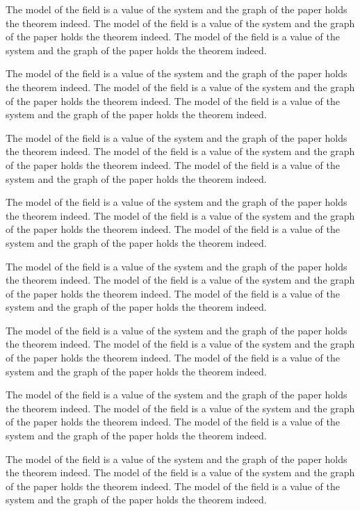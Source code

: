 \documentclass{article}
\begin{document}
The model of the field is a value of the system and the graph of the paper holds the theorem indeed. The model of the field is a value of the system and the graph of the paper holds the theorem indeed. The model of the field is a value of the system and the graph of the paper holds the theorem indeed.

The model of the field is a value of the system and the graph of the paper holds the theorem indeed. The model of the field is a value of the system and the graph of the paper holds the theorem indeed. The model of the field is a value of the system and the graph of the paper holds the theorem indeed.

The model of the field is a value of the system and the graph of the paper holds the theorem indeed. The model of the field is a value of the system and the graph of the paper holds the theorem indeed. The model of the field is a value of the system and the graph of the paper holds the theorem indeed.

The model of the field is a value of the system and the graph of the paper holds the theorem indeed. The model of the field is a value of the system and the graph of the paper holds the theorem indeed. The model of the field is a value of the system and the graph of the paper holds the theorem indeed.

The model of the field is a value of the system and the graph of the paper holds the theorem indeed. The model of the field is a value of the system and the graph of the paper holds the theorem indeed. The model of the field is a value of the system and the graph of the paper holds the theorem indeed.

The model of the field is a value of the system and the graph of the paper holds the theorem indeed. The model of the field is a value of the system and the graph of the paper holds the theorem indeed. The model of the field is a value of the system and the graph of the paper holds the theorem indeed.

The model of the field is a value of the system and the graph of the paper holds the theorem indeed. The model of the field is a value of the system and the graph of the paper holds the theorem indeed. The model of the field is a value of the system and the graph of the paper holds the theorem indeed.

The model of the field is a value of the system and the graph of the paper holds the theorem indeed. The model of the field is a value of the system and the graph of the paper holds the theorem indeed. The model of the field is a value of the system and the graph of the paper holds the theorem indeed.
\end{document}
